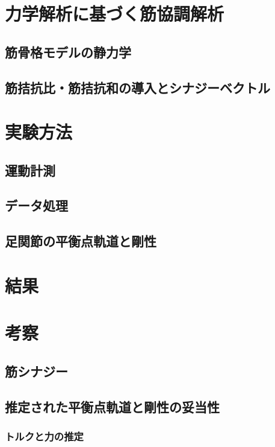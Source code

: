 \section{力学解析に基づく筋協調解析}

\subsection{筋骨格モデルの静力学}

\subsection{筋拮抗比・筋拮抗和の導入とシナジーベクトル}

\section{実験方法}

\subsection{運動計測}

\subsection{データ処理}

\subsection{足関節の平衡点軌道と剛性}

\section{結果}
%
\clearpage
\section{考察}

\subsection{筋シナジー}

\subsection{推定された平衡点軌道と剛性の妥当性}

\subsubsection{トルクと力の推定}

